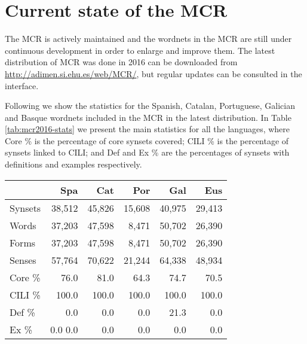 \documentclass[runningheads]{llncs}
\begin{document}
\section{Current state of the MCR}

The MCR is actively maintained and the wordnets in the MCR are still under continuous development in order to enlarge and improve them.   The latest distribution of MCR was done in 2016 can be downloaded from \url{http://adimen.si.ehu.es/web/MCR/}, but regular updates can be consulted in the interface. 




Following we show the statistics for the Spanish, Catalan, Portuguese, Galician and Basque wordnets included in the MCR in the latest distribution.  In Table \ref{tab:mcr2016-stats} we present the main statistics for all the languages, where Core \% is the percentage of core synsets covered;     CILI \% is the percentage of synsets linked to CILI; and     Def and Ex \% are the percentages of synsets       with definitions and examples respectively.


\begin{table*}[!h]
\centering 
  \begin{tabular}{lrrrrr}
 & Spa & Cat & Por & Gal & Eus \\   \hline
  Synsets &   38,512 &   45,826 & 15,608 & 40,975 &  29,413 \\ 
 Words &   37,203  &    47,598  &  8,471  &   50,702  &  26,390 \\ 
Forms &  37,203  & 47,598  &   8,471  &   50,702  &  26,390 \\ 
  Senses & 57,764 & 70,622 &  21,244 &   64,338 & 48,934 \\ 
 Core \% &   76.0 &  81.0 &  64.3 &   74.7 &  70.5 \\ 
  CILI \% &100.0 & 100.0 &  100.0 &  100.0 & 100.0 \\ 
 Def \% &  0.0 &    0.0 &   0.0 &  21.3 & 0.0  \\ 
 Ex \% & 0.0   0.0 &   0.0 & 0.0 & 0.0   & 0.0 \\ \hline
  \end{tabular}
   \caption{Main Statistics for MCR 3.0 (2016)}
  \label{tab:mcr2016-stats}
\end{table*}
\end{document}

